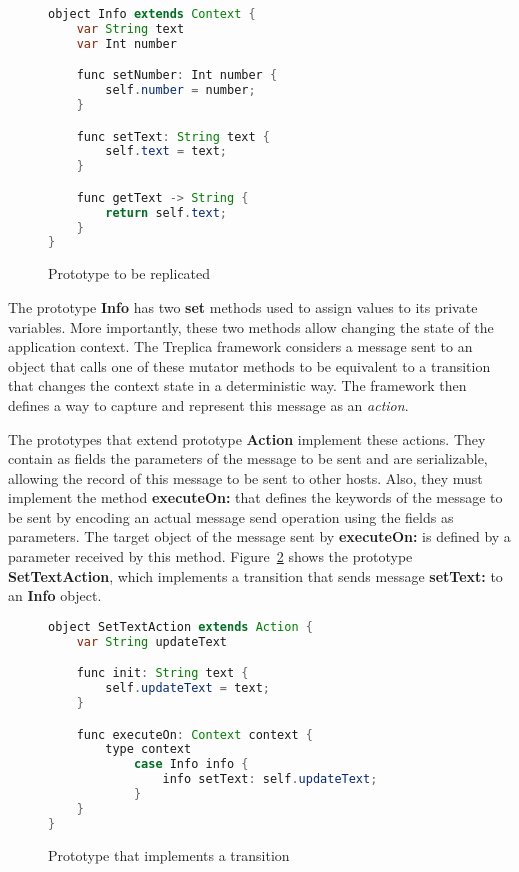 \documentclass[preprint,review]{elsarticle}
\newcommand{\srcstyle}[1]{\ttfamily\textbf{#1}\rmfamily}
\begin{document}
\begin{figure}[h]
\centering
\begin{lstlisting}[language=Java]
object Info extends Context {
    var String text
    var Int number

    func setNumber: Int number {
        self.number = number;
    }

    func setText: String text {
        self.text = text;
    }

    func getText -> String {
        return self.text;
    }
}
\end{lstlisting}
\caption{Prototype to be replicated}
\label{fig:TreplicaDados}
\end{figure}

The prototype  \srcstyle{Info} has two \srcstyle{set}  methods used to
assign values to  its private variables.  More  importantly, these two
methods  allow changing  the state  of the  application context.   The
Treplica framework  considers a message  sent to an object  that calls
one of  these mutator methods  to be  equivalent to a  transition that
changes the context  state in a deterministic way.  The framework then
defines  a   way  to  capture   and  represent  this  message   as  an
\emph{action}.

The prototypes that extend prototype \srcstyle{Action} implement these
actions.  They contain  as fields the parameters of the  message to be
sent and are  serializable, allowing the record of this  message to be
sent  to   other  hosts.   Also,   they  must  implement   the  method
\srcstyle{executeOn:} that defines  the keywords of the  message to be
sent by encoding an actual message  send operation using the fields as
parameters.    The   target   object    of   the   message   sent   by
\srcstyle{executeOn:}  is  defined by  a  parameter  received by  this
method.     Figure~\ref{fig:TreplicaAction}   shows    the   prototype
\srcstyle{SetTextAction},  which implements  a  transition that  sends
message \srcstyle{setText:} to an \srcstyle{Info} object.

\begin{figure}[h]
\centering
\begin{lstlisting}[language=Java]
object SetTextAction extends Action {
    var String updateText

    func init: String text {
        self.updateText = text;
    }

    func executeOn: Context context {
        type context
            case Info info {
                info setText: self.updateText;
            }
    }
}
\end{lstlisting}
\caption{Prototype that implements a transition}
\label{fig:TreplicaAction}
\end{figure}
\end{document}
